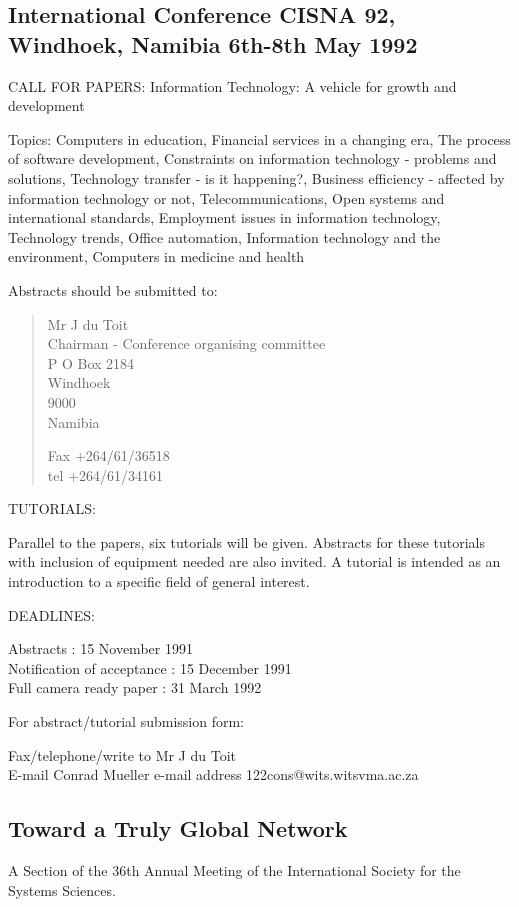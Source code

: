 \subsection{International Conference CISNA 92, Windhoek, Namibia
6th-8th May 1992}

CALL FOR PAPERS: Information Technology: A vehicle for growth and development
 
Topics: Computers in education, Financial services in a changing era,
The process of software development, Constraints on information
technology - problems and solutions, Technology transfer - is it
happening?, Business efficiency - affected by information technology
or not, Telecommunications, Open systems and international standards,
Employment issues in information technology, Technology trends, Office
automation, Information technology and the environment, Computers in
medicine and health
 
 Abstracts should be submitted to:
\begin{verse} 
     Mr J du Toit\\
     Chairman - Conference organising committee\\
     P O Box 2184\\
     Windhoek\\
     9000\\
     Namibia
 
     Fax +264/61/36518\\
     tel +264/61/34161
\end{verse}
 
 TUTORIALS:

     Parallel to the papers, six tutorials will be given. Abstracts
     for these tutorials with inclusion of equipment needed are also
     invited. A tutorial is intended as an introduction to a specific
     field of general interest.
 
 DEADLINES:

       Abstracts                  : 15 November 1991\\
       Notification of acceptance : 15 December 1991\\
       Full camera ready paper    : 31 March 1992
 
 For abstract/tutorial submission form:
 
     Fax/telephone/write to Mr J du Toit\\
     E-mail Conrad Mueller e-mail address 122cons@wits.witsvma.ac.za
 

\subsection{Toward a Truly Global Network}
A Section of the 36th Annual Meeting of the International Society for
the Systems Sciences.

